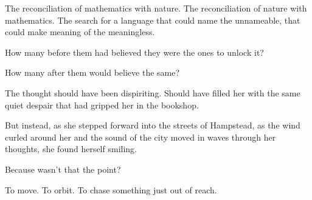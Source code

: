 The reconciliation of mathematics with nature. The reconciliation of nature with mathematics. The search for a language that could name the unnameable, that could make meaning of the meaningless.

How many before them had believed they were the ones to unlock it?

How many after them would believe the same?

The thought should have been dispiriting. Should have filled her with the same quiet despair that had gripped her in the bookshop.

But instead, as she stepped forward into the streets of Hampstead, as the wind curled around her and the sound of the city moved in waves through her thoughts, she found herself smiling.

Because wasn’t that the point?

To move. To orbit. To chase something just out of reach.